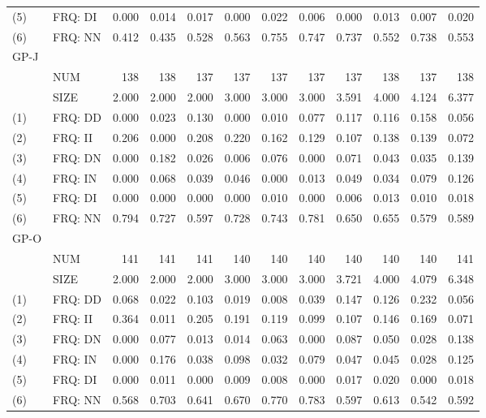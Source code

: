 \begin{table}[H]
\begin{tabular}{llrrrrrrrrrr}
		(5)  & FRQ: DI & 0.000 & 0.014 & 0.017 & 0.000 &  0.022 &  0.006 &  0.000 &  0.013 &  0.007 &  0.020 \\
		(6)  & FRQ: NN & 0.412 & 0.435 & 0.528 & 0.563 &  0.755 &  0.747 &  0.737 &  0.552 &  0.738 &  0.553 \\ \hline
		GP-J &         &       &       &       &       &        &        &        &        &        &        \\
		& NUM     &   138 &   138 &   137 &   137 &    137 &    137 &    137 &    138 &    137 &    138 \\
		& SIZE    & 2.000 & 2.000 & 2.000 & 3.000 &  3.000 &  3.000 &  3.591 &  4.000 &  4.124 &  6.377 \\
		(1)  & FRQ: DD & 0.000 & 0.023 & 0.130 & 0.000 &  0.010 &  0.077 &  0.117 &  0.116 &  0.158 &  0.056 \\
		(2)  & FRQ: II & 0.206 & 0.000 & 0.208 & 0.220 &  0.162 &  0.129 &  0.107 &  0.138 &  0.139 &  0.072 \\
		(3)  & FRQ: DN & 0.000 & 0.182 & 0.026 & 0.006 &  0.076 &  0.000 &  0.071 &  0.043 &  0.035 &  0.139 \\
		(4)  & FRQ: IN & 0.000 & 0.068 & 0.039 & 0.046 &  0.000 &  0.013 &  0.049 &  0.034 &  0.079 &  0.126 \\
		(5)  & FRQ: DI & 0.000 & 0.000 & 0.000 & 0.000 &  0.010 &  0.000 &  0.006 &  0.013 &  0.010 &  0.018 \\
		(6)  & FRQ: NN & 0.794 & 0.727 & 0.597 & 0.728 &  0.743 &  0.781 &  0.650 &  0.655 &  0.579 &  0.589 \\ \hline
		GP-O &         &       &       &       &       &        &        &        &        &        &        \\
		& NUM     &   141 &   141 &   141 &   140 &    140 &    140 &    140 &    140 &    140 &    141 \\
		& SIZE    & 2.000 & 2.000 & 2.000 & 3.000 &  3.000 &  3.000 &  3.721 &  4.000 &  4.079 &  6.348 \\
		(1)  & FRQ: DD & 0.068 & 0.022 & 0.103 & 0.019 &  0.008 &  0.039 &  0.147 &  0.126 &  0.232 &  0.056 \\
		(2)  & FRQ: II & 0.364 & 0.011 & 0.205 & 0.191 &  0.119 &  0.099 &  0.107 &  0.146 &  0.169 &  0.071 \\
		(3)  & FRQ: DN & 0.000 & 0.077 & 0.013 & 0.014 &  0.063 &  0.000 &  0.087 &  0.050 &  0.028 &  0.138 \\
		(4)  & FRQ: IN & 0.000 & 0.176 & 0.038 & 0.098 &  0.032 &  0.079 &  0.047 &  0.045 &  0.028 &  0.125 \\
		(5)  & FRQ: DI & 0.000 & 0.011 & 0.000 & 0.009 &  0.008 &  0.000 &  0.017 &  0.020 &  0.000 &  0.018 \\
		(6)  & FRQ: NN & 0.568 & 0.703 & 0.641 & 0.670 &  0.770 &  0.783 &  0.597 &  0.613 &  0.542 &  0.592 \\ \hline\hline
	\end{tabular}
\end{table}

